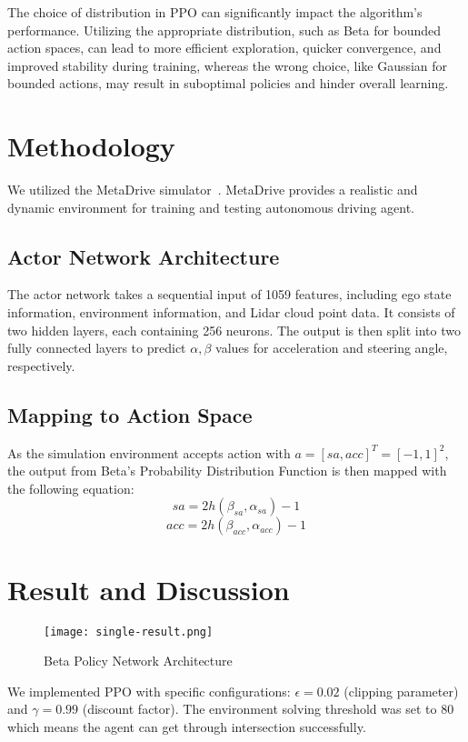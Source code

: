 The choice of distribution in PPO can significantly impact the algorithm's performance. Utilizing the appropriate distribution, such as Beta for bounded action spaces, can lead to more efficient exploration, quicker convergence, and improved stability during training, whereas the wrong choice, like Gaussian for bounded actions, may result in suboptimal policies and hinder overall learning.

\section{Methodology}
We utilized the MetaDrive simulator~\cite{li2021metadrive}.
MetaDrive provides a realistic and dynamic environment for training and testing autonomous driving agent.

\subsection{Actor Network Architecture}
The actor network takes a sequential input of 1059 features, including ego state information, environment information, and Lidar cloud point data.
It consists of two hidden layers, each containing 256 neurons.
The output is then split into two fully connected layers to predict $\alpha,\beta$ values for acceleration and steering angle, respectively.

\subsection{Mapping to Action Space}
As the simulation environment accepts action with $a = [sa,acc]^T=[-1,1]^2$, the output from Beta's Probability Distribution Function is then mapped with the following equation:
\begin{equation}
    sa = 2h(\beta_{sa}, \alpha_{sa}) - 1\label{eq:equation5}
\end{equation}
\begin{equation}
    acc = 2h(\beta_{acc}, \alpha_{acc}) - 1\label{eq:equation6}
\end{equation}

\section{Result and Discussion}\label{sec:result-and-discussion}
\begin{figure}[H]
    \centering
    \texttt{[image: single-result.png]}
    \caption{Beta Policy Network Architecture}\label{fig:figure}
\end{figure}
We implemented PPO with specific configurations: $\epsilon = 0.02$ (clipping parameter) and $\gamma = 0.99$ (discount factor). The environment solving threshold was set to 80 which means the agent can get through intersection successfully.

